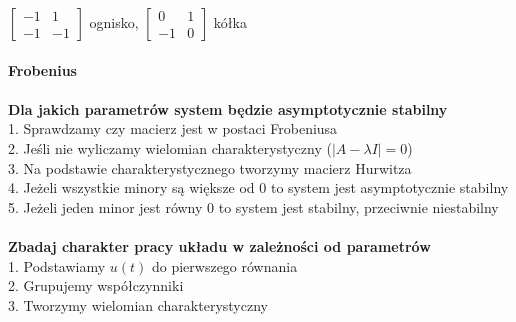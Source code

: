 $\left[\begin{array}{cc}-1&1\\-1&-1\end{array}\right]$ ognisko, $\left[\begin{array}{cc}0&1\\-1&0\end{array}\right]$ kółka\\
\\
\textbf{Frobenius}\\
\pagebreak\\
\textbf{Dla jakich parametrów system będzie asymptotycznie stabilny}\\
1. Sprawdzamy czy macierz jest w postaci Frobeniusa\\
2. Jeśli nie wyliczamy wielomian charakterystyczny ($|A-\lambda I|=0$)\\
3. Na podstawie charakterystycznego tworzymy macierz Hurwitza\\
4. Jeżeli wszystkie minory są większe od 0 to system jest asymptotycznie stabilny\\
5. Jeżeli jeden minor jest równy 0 to system jest stabilny, przeciwnie niestabilny\\
\\
\textbf{Zbadaj charakter pracy układu w zależności od parametrów}\\
1. Podstawiamy $u(t)$ do pierwszego równania\\
2. Grupujemy współczynniki\\
3. Tworzymy wielomian charakterystyczny\\

